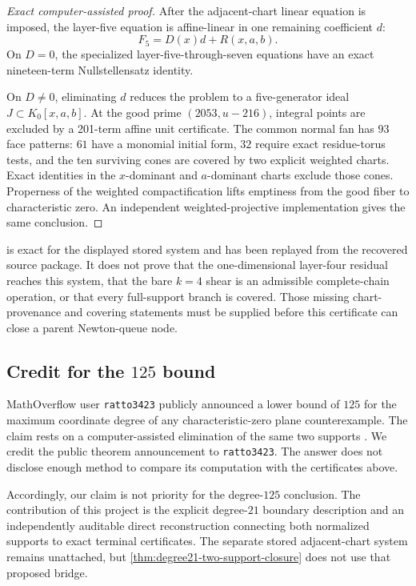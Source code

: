 \begin{proof}[Exact computer-assisted proof]
After the adjacent-chart linear equation is imposed, the layer-five
equation is affine-linear in one remaining coefficient \(d\):
\[
F_5=D(x)d+R(x,a,b).
\]
On \(D=0\), the specialized layer-five-through-seven equations have an
exact nineteen-term Nullstellensatz identity.

On \(D\ne0\), eliminating \(d\) reduces the problem to a five-generator
ideal \(J\subset K_0[x,a,b]\).  At the good prime
\((2053,u-216)\), integral points are excluded by a 201-term affine unit
certificate.  The common normal fan has \(93\) face patterns: \(61\) have a
monomial initial form, \(32\) require exact residue-torus tests, and the ten
surviving cones are covered by two explicit weighted charts.  Exact
identities in the \(x\)-dominant and \(a\)-dominant charts exclude those
cones.  Properness of the weighted compactification lifts emptiness from the
good fiber to characteristic zero.  An independent weighted-projective
implementation gives the same conclusion.
\end{proof}

 is exact for the displayed stored
system and has been replayed from the recovered source package.  It does not
prove that the one-dimensional layer-four residual reaches this system, that
the bare \(k=4\) shear is an admissible complete-chain operation, or that
every full-support branch is covered.  Those missing chart-provenance and
covering statements must be supplied before this certificate can close a
parent Newton-queue node.

\subsection{Credit for the \texorpdfstring{\(125\)}{125} bound}

MathOverflow user \texttt{ratto3423} publicly announced a lower bound of
\(125\) for the maximum coordinate degree of any characteristic-zero plane
counterexample.  The claim rests on a computer-assisted elimination of the
same two supports \cite{ratto3423degree125}.  We credit the public theorem
announcement to \texttt{ratto3423}.  The answer does not disclose enough
method to compare its computation with the certificates above.

Accordingly, our claim is not priority for the degree-\(125\) conclusion.
The contribution of this project is the explicit degree-\(21\) boundary
description and an independently auditable direct reconstruction connecting
both normalized supports to exact terminal certificates.  The separate
stored adjacent-chart system remains unattached, but
\cref{thm:degree21-two-support-closure} does not use that proposed bridge.

